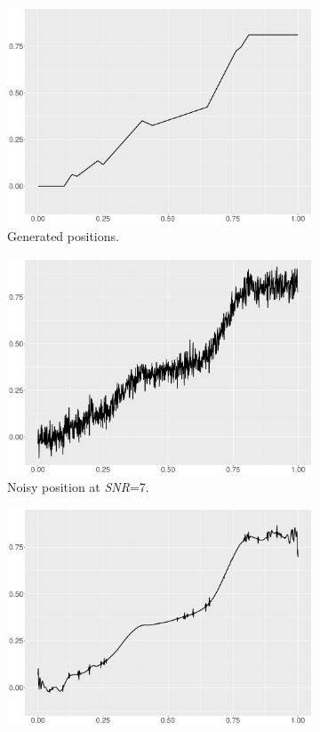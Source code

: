 \begin{figure}
    \begin{subfigure}{0.45\textwidth}
    \centering
    \includegraphics[width=\linewidth,height=0.45\textwidth]{Chapters/02TractorSplineTheory/plot/ggplot/ggBlocksPosition.pdf}
    \caption{Generated positions.}
    \end{subfigure}
    \begin{subfigure}{0.45\textwidth}
    \centering
    \includegraphics[width=\linewidth,height=0.45\textwidth]{Chapters/02TractorSplineTheory/plot/ggplot/ggBlocksPositionNoise.pdf}
    \caption{Noisy position at \textit{SNR}=7.}
    \end{subfigure}
    \begin{subfigure}{0.45\textwidth}
    \centering
    \includegraphics[width=\linewidth,height=0.45\textwidth]{Chapters/02TractorSplineTheory/plot/ggplot/ggBlocksSure.pdf}

\end{subfigure}
\end{figure}
